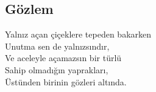 \subsection{Gözlem}

Yalnız açan çiçeklere tepeden bakarken \\
Unutma sen de yalnızsındır, \\
Ve aceleyle açamazsın bir türlü \\
Sahip olmadığın yaprakları, \\
Üstünden birinin gözleri altında. \\